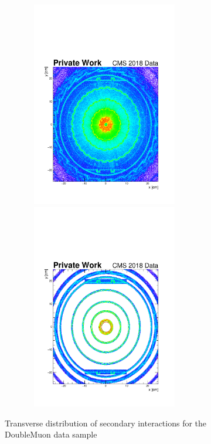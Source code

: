 \documentclass{cernatlasnote}
\begin{document}
\begin{figure}[ht]
\hspace{-1 cm}
\includegraphics[height=9cm, width=9cm, trim= 0cm 0cm 0cm 0.cm,clip]{images/SecInt/DoubleMuon_UL2018_MiniAODv2_GT36-v1_hData_reco_SecInt_xy_Selec.pdf}\includegraphics[height=9cm, width=9cm, trim= 0cm 0cm 0cm 0.cm,clip]{images/SecInt/DoubleMuon_UL2018_MiniAODv2_GT36-v1_hData_reco_SecInt_xy_TrackerMatched.pdf}
\caption{\label{fig:Veto} Transverse distribution of secondary interactions for the DoubleMuon data sample}
\end{figure}
\end{document}
